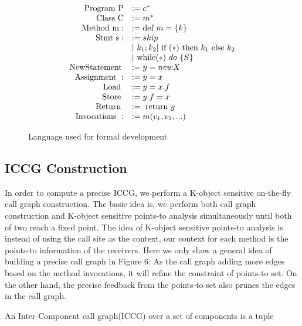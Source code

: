 \documentclass{sig-alternate}
\begin{document}
\begin{figure}
\begin{center}
\[
\begin{array}{rl}
{\rm Program \ P} &:=  c^* \\
{\rm Class \ C} &:=  m^* \\
{\rm Method \  m:} &:= \text{def} \ m = \{k\} \\
{\rm  Stmt \ s:} &:= skip  \\
                                & | \ k_1; k_2 | \text{ if }(*) \text{ then } k_1 \text{ else } k_2 \\
                                & | \  \text{while}(*) \ do \ \{S\}\\
 {\rm New Statement \:} &:= y=new X  \\
{\rm Assignment \ :} &:= y=x  \\
{\rm Load \ } &:=y = x.f \\
{\rm Store \ } &:= y.f = x \\
{\rm Return \ } &:= \text{ return } y \\
{\rm  Invocations \ :} &:= m(v_1, v_2,...)
\end{array}
\]
\end{center}
\caption{Language used for formal development}
\label{fig-ffsm}
\end{figure}

\subsection{ICCG Construction}
In order to compute a precise ICCG, we perform a K-object sensitive on-the-fly call graph construction. The basic idea is, we perform both call graph construction and K-object sensitive points-to analysis simultaneously until both of two reach a fixed point. The idea of K-object sensitive points-to analysis is instead of using the call site as the context, our context for each method is the points-to information of the receivers. Here we only show a general idea of building a precise call graph in Figure 6: As the call graph adding more edges based on the method invocations, it will refine the constraint of points-to set. On the other hand, the precise feedback from the points-to set also prunes the edges in the call graph.

An Inter-Component call graph(ICCG) over a set of components is a tuple
\end{document}

